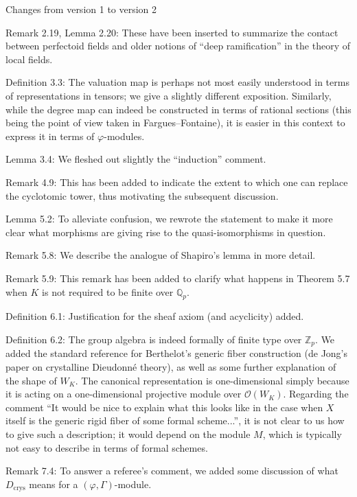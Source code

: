 \documentclass[12pt]{amsart}
\begin{document}
\begin{center}
Changes from version 1 to version 2
\end{center}

Remark 2.19, Lemma 2.20: These have been inserted to summarize the contact between perfectoid fields and older notions of ``deep ramification'' in the theory of local fields.

Definition 3.3: The valuation map is perhaps not most easily understood in terms of representations in tensors; we give a slightly different exposition. Similarly, while the degree map can indeed be constructed in terms of rational sections (this being the point of view taken in Fargues--Fontaine), it is easier in this context to express it in terms of $\varphi$-modules.

Lemma 3.4: We fleshed out slightly the ``induction'' comment.

Remark 4.9: This has been added to indicate the extent to which one can replace the cyclotomic tower, thus motivating the subsequent discussion.

Lemma 5.2: To alleviate confusion, we rewrote the statement to make it more clear what morphisms are giving rise to the quasi-isomorphisms in question.

Remark 5.8: We describe the analogue of Shapiro's lemma in more detail.

Remark 5.9: This remark has been added to clarify what happens in Theorem 5.7 when $K$ is not required to be finite over $\mathbb{Q}_p$.

Definition 6.1: Justification for the sheaf axiom (and acyclicity) added.

Definition 6.2: The group algebra is indeed formally of finite type over $\mathbb{Z}_p$. We added the standard reference for Berthelot's generic fiber construction (de Jong's paper on crystalline Dieudonn\'e theory), as well as some further explanation of the shape of $W_K$. The canonical representation is one-dimensional simply because it is acting on a one-dimensional projective module over $\mathcal{O}(W_K)$. Regarding the comment ``It would be nice to explain what this looks like in the case when $X$ itself is the generic rigid fiber of some formal scheme...'', it is not clear to us how to give such a description; it would depend on the module $M$, which is typically not easy to describe in terms of formal schemes.

Remark 7.4: To answer a referee's comment, we added some discussion of what $D_{\mathrm{crys}}$ means for a $(\varphi, \Gamma)$-module.
\end{document}
